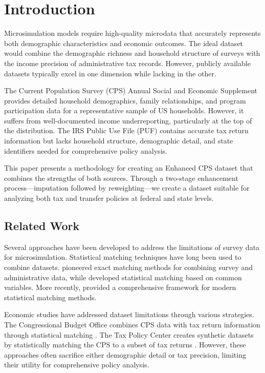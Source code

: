 \section{Introduction}



Microsimulation models require high-quality microdata that accurately represents both demographic characteristics and economic outcomes. The ideal dataset would combine the demographic richness and household structure of surveys with the income precision of administrative tax records. However, publicly available datasets typically excel in one dimension while lacking in the other.

The Current Population Survey (CPS) Annual Social and Economic Supplement provides detailed household demographics, family relationships, and program participation data for a representative sample of US households. However, it suffers from well-documented income underreporting, particularly at the top of the distribution. The IRS Public Use File (PUF) contains accurate tax return information but lacks household structure, demographic detail, and state identifiers needed for comprehensive policy analysis.

This paper presents a methodology for creating an Enhanced CPS dataset that combines the strengths of both sources. Through a two-stage enhancement process—imputation followed by reweighting—we create a dataset suitable for analyzing both tax and transfer policies at federal and state levels.

\subsection{Related Work}

Several approaches have been developed to address the limitations of survey data for microsimulation. Statistical matching techniques have long been used to combine datasets. \citep{radner1978} pioneered exact matching methods for combining survey and administrative data, while \citep{rodgers1984} developed statistical matching based on common variables. More recently, \citep{d'orazio2006} provided a comprehensive framework for modern statistical matching methods.

Economic studies have addressed dataset limitations through various strategies. The Congressional Budget Office combines CPS data with tax return information through statistical matching \citep{cbo2022}. The Tax Policy Center creates synthetic datasets by statistically matching the CPS to a subset of tax returns \citep{rohaly2005}. However, these approaches often sacrifice either demographic detail or tax precision, limiting their utility for comprehensive policy analysis.

